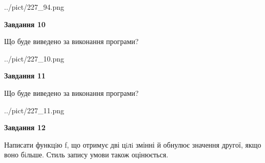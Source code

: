 \documentclass[12pt, ukrainian]{article}
\begin{document}
{\begin {large}
\begin{center}
	{../pict/227_94.png}
\end{center}
\newpage

{\begin {center}\textbf{Завдання 10}\end {center}}

Що буде виведено за виконання програми?\par
\begin{center}
	{../pict/227_10.png}
\end{center}
\newpage

{\begin {center}\textbf{Завдання 11}\end {center}}

Що буде виведено за виконання програми?\par
\begin{center}
	{../pict/227_11.png}
\end{center}
\newpage

{\begin {center}\textbf{Завдання 12}\end {center}}


Написати функцiю f, що отримує дві цiлi змінні й обнулює значення другої, якщо воно бiльше. Стиль запису умови також оцінюється.\par
\newpage

\end {large}}
\end{document}
